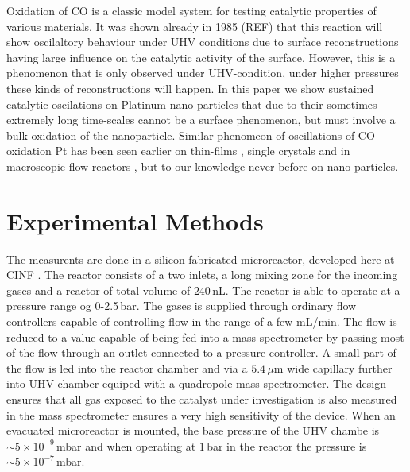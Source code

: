 \documentclass[8.5pt,twoside,twocolumn]{article}
\begin{document}


Oxidation of CO is a classic model system for testing catalytic properties of various materials. It was shown already in 1985 (REF) that this reaction will show oscilaltory behaviour under UHV conditions due to surface reconstructions having large influence on the catalytic activity of the surface. However, this is a phenomenon that is only observed under UHV-condition, under higher pressures these kinds of reconstructions will happen. In this paper we show sustained catalytic oscilations on Platinum nano particles that due to their sometimes extremely long time-scales cannot be a surface phenomenon, but must involve a bulk oxidation of the nanoparticle. 
Similar phenomeon of oscillations of CO oxidation Pt has been seen earlier on thin-films \cite{Lund2000}, single crystals \cite{Hendriksen2005} and in macroscopic flow-reactors \cite{Singh2010}, but to our knowledge never before on nano particles.

\section{Experimental Methods}
The measurents are done in a silicon-fabricated microreactor, developed here at CINF \cite{Henriksen2009}. The reactor consists of a two inlets, a long mixing zone for the incoming gases and a reactor of total volume of $240\,$nL. The reactor is able to operate at a pressure range og 0-2.5\,bar. The gases is supplied through ordinary flow controllers capable of controlling flow in the range of a few mL/min. The flow is reduced to a value capable of being fed into a mass-spectrometer by passing most of the flow through an outlet connected to a pressure controller. A small part of the flow is led into the reactor chamber and via a $5.4\,\mu$m wide capillary further into UHV chamber equiped with a quadropole mass spectrometer. The design ensures that all gas exposed to the catalyst under investigation is also measured in the mass spectrometer ensures a very high sensitivity of the device. When an evacuated microreactor is mounted, the base pressure of the UHV chambe is $\sim5\times10^{-9}\,$mbar and when operating at $1\,$bar in the reactor the pressure is $\sim5\times10^{-7}\,$mbar.
\end{document}
